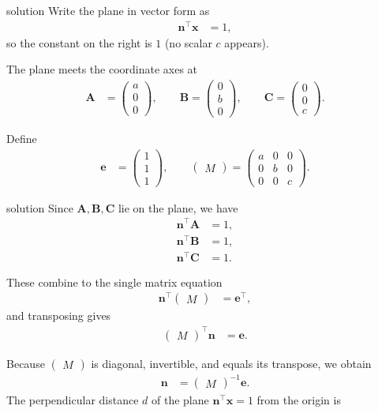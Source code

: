 \documentclass{beamer}
\numberwithin{equation}{section}
\theoremstyle{remark}
\newcommand{\myvec}[1]{\ensuremath{\begin{pmatrix}#1\end{pmatrix}}}
\let\vec\mathbf
\begin{document}
\begin{frame}{solution}
Write the plane in vector form as
\begin{align}
\vec{n}^\top \vec{x} &= 1,
\end{align}
so the constant on the right is \(1\) (no scalar \(c\) appears).

The plane meets the coordinate axes at
\begin{align}
\vec{A} &= \myvec{a\\0\\0}, \qquad
\vec{B} = \myvec{0\\b\\0}, \qquad
\vec{C} = \myvec{0\\0\\c}.
\end{align}

Define
\begin{align}
\vec{e} &= \myvec{1\\1\\1}, \qquad 
\myvec{M} = \myvec{a&0&0\\[4pt]0&b&0\\[4pt]0&0&c}.
\end{align}
\end{frame}
\begin{frame}{solution}
Since $\vec{A},\vec{B},\vec{C}$ lie on the plane, we have
\begin{align}
\vec{n}^\top \vec{A} &= 1, \\[4pt]
\vec{n}^\top \vec{B} &= 1, \\[4pt]
\vec{n}^\top \vec{C} &= 1.
\end{align}

These combine to the single matrix equation
\begin{align}
\vec{n}^\top \myvec{M} &= \vec{e}^\top,
\end{align}
and transposing gives
\begin{align}
\myvec{M}^\top \vec{n} &= \vec{e}.
\end{align}

Because \(\myvec{M}\) is diagonal, invertible, and equals its transpose, we obtain
\begin{align}
\vec{n} &= \myvec{M}^{-1}\vec{e}.
\end{align}
The perpendicular distance \(d\) of the plane \(\vec{n}^\top \vec{x}=1\) from the origin is
\end{frame}
\end{document}

